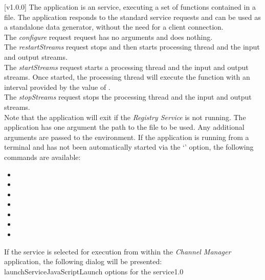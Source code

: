 [v1.0.0]
The  application is an  service,
executing a set of \JS{} functions contained in a file.
The application responds to the standard  service requests and can be used
as a standalone data generator, without the need for a client connection.\\

The \emph{configure} request request has no arguments and does nothing.\\

The \emph{restartStreams} request stops and then starts processing thread and the input
and output streams.\\

The \emph{startStreams} request starts a processing thread and the input and output
streams.
Once started, the processing thread will execute the  function with
an interval provided by the value of .\\

The \emph{stopStreams} request stops the processing thread and the input and output
streams.\\ 

Note that the application will exit if the \emph{Registry Service} is not running.
The application has one argument \longDash{} the path to the \JS{} file to be used.
Any additional arguments are passed to the \JS{} environment.
\insertAppParameters
\insertTagDescription{\JSIO}
\insertFilterServiceComment
\condPage{}
If the application is running from a terminal and has not been automatically started via
the `' option, the following commands are available:
\begin{itemize}
\item{}
\item\exSp{}
\item\exSp{}
\item\exSp{}
\item\exSp{}
\item\exSp{}
\item\exSp{}
\end{itemize}
\secondaryEnd
\condPage
{}
If the service is selected for execution from within the \emph{Channel Manager}
application, the following dialog will be presented:
%
{launchServiceJavaScript}{Launch options for the \JSIO{} service}{1.0}

